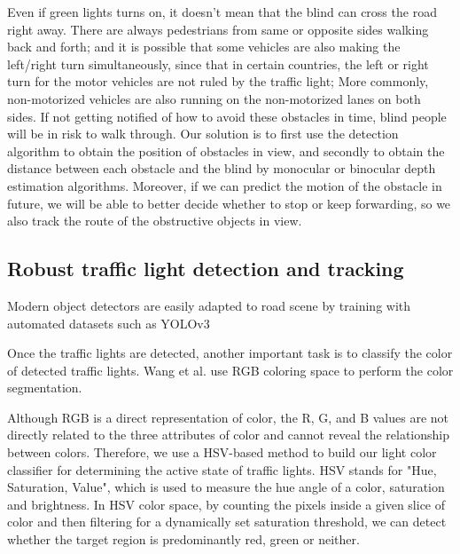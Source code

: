  Even if green lights turns on, it doesn't mean that the blind can cross the road right away. There are always pedestrians from same or opposite sides walking back and forth; and it is possible that some vehicles are also making the left/right turn simultaneously, since that in certain countries, the left or right turn for the motor vehicles are not ruled by the traffic light; More commonly, non-motorized vehicles are also running on the non-motorized lanes on both sides. If not getting notified of how to avoid these obstacles in time, blind people will be in risk to walk through. Our solution is to first use the detection algorithm to obtain the position of obstacles in view, and secondly to obtain the distance between each obstacle and the blind by monocular or binocular depth estimation algorithms. Moreover, if we can predict the motion of the obstacle in future, we will be able to better decide whether to stop or keep forwarding, so we also track the route of the obstructive objects in view.

\subsection{Robust traffic light detection and tracking}
 Modern object detectors are easily adapted to road scene by training with automated datasets such as  YOLOv3~\cite{redmon-farhadi:2018}



Once the traffic lights are detected, another important task is to classify the color of detected traffic lights. Wang et al. \cite{wang-et-al:2014} use RGB coloring space to perform the color segmentation.


Although RGB is a direct representation of color, the R, G, and B values are not directly related to the three attributes of color and cannot reveal the relationship between colors.
Therefore, we use a HSV-based method to build our light color classifier for determining the active state of traffic lights. HSV stands for "Hue, Saturation, Value", which is used to measure the hue angle of a color, saturation and brightness. In HSV color space, by counting the pixels inside a given slice of color and then filtering for a dynamically set saturation threshold, we can detect whether the target region is predominantly red, green or neither.


